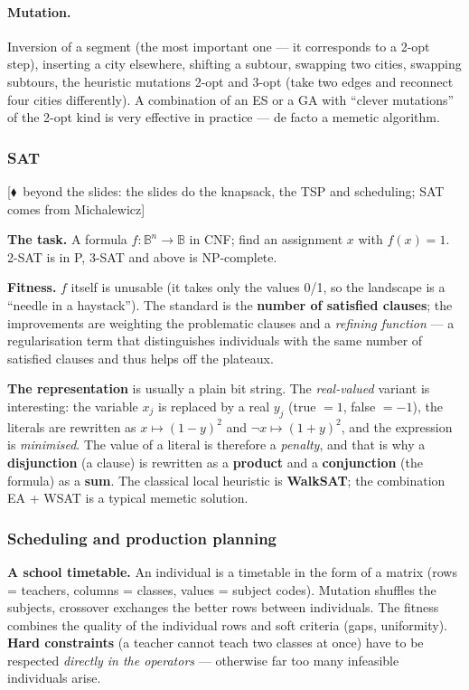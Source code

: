 \documentclass[11pt,a4paper]{article}
\theoremstyle{definition}
\providecommand{\uv}[1]{``#1''}
\newcommand{\mimoq}[1]{\textcolor{markcol}{\textsf{\footnotesize[$\blacklozenge$~beyond the slides: #1]}}}
\begin{document}
\paragraph{Mutation.} Inversion of a segment (the most important one --- it
corresponds to a 2-opt step), inserting a city elsewhere, shifting a subtour,
swapping two cities, swapping subtours, the heuristic mutations 2-opt and 3-opt
(take two edges and reconnect four cities differently). A combination of an ES
or a GA with \uv{clever mutations} of the 2-opt kind is very effective in
practice --- de facto a memetic algorithm.

\subsubsection{SAT}

\noindent\mimoq{the slides do the knapsack, the TSP and scheduling; SAT comes from Michalewicz}

\textbf{The task.} A formula $f: \mathbb{B}^n \to \mathbb{B}$ in CNF; find an assignment $x$
with $f(x)=1$. 2-SAT is in P, 3-SAT and above is NP-complete.

\textbf{Fitness.} $f$ itself is unusable (it takes only the values 0/1, so the landscape is a
\uv{needle in a haystack}). The standard is the \textbf{number of satisfied clauses}; the
improvements are weighting the problematic clauses and a \emph{refining function} --- a
regularisation term that distinguishes individuals with the same number of satisfied clauses
and thus helps off the plateaux.

\textbf{The representation} is usually a plain bit string. The \emph{real-valued} variant is
interesting: the variable $x_j$ is replaced by a real $y_j$ (true $=1$, false $=-1$), the
literals are rewritten as $x \mapsto (1-y)^2$ and $\neg x \mapsto (1+y)^2$, and the expression
is \emph{minimised}. The value of a literal is therefore a \emph{penalty}, and that is why a
\textbf{disjunction} (a clause) is rewritten as a \textbf{product} and a \textbf{conjunction}
(the formula) as a \textbf{sum}. The classical local heuristic is \textbf{WalkSAT}; the
combination EA + WSAT is a typical memetic solution.

\subsubsection{Scheduling and production planning}

\textbf{A school timetable.} An individual is a timetable in the form of a matrix (rows =
teachers, columns = classes, values = subject codes). Mutation shuffles the subjects,
crossover exchanges the better rows between individuals. The fitness combines the quality of
the individual rows and soft criteria (gaps, uniformity). \textbf{Hard constraints} (a
teacher cannot teach two classes at once) have to be respected \emph{directly in the
operators} --- otherwise far too many infeasible individuals arise.
\end{document}
